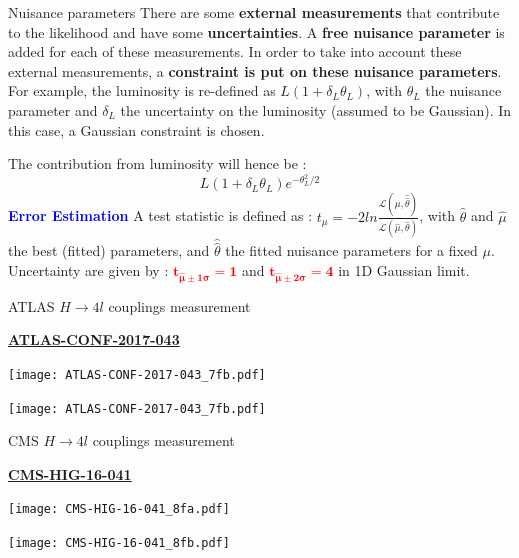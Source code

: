 \begin{frame}{Nuisance parameters}
There are some {\bf external measurements}  that contribute to the likelihood and have some {\bf uncertainties}. 
A {\bf free nuisance parameter} is added for each of these measurements.
In order  to take into account these external measurements, a {\bf constraint is put on these nuisance parameters}. 
\vfill
For example, the luminosity is re-defined as  $L(1+\delta_L \theta_L)$, with $\theta_L$ the nuisance parameter and $\delta_L$ the uncertainty on the luminosity (assumed to be Gaussian).
In this case, a Gaussian constraint is chosen.

The contribution from luminosity will hence be :
$$L(1+\delta_L \theta_L)e^{-\theta_L^2/2}$$
\vfill
\textcolor{blue}{\bf Error Estimation}\newline
A test statistic is defined as : $t_\mu=-2ln\frac{\mathcal{L}(\mu,\hat{\hat{\theta}})}{\mathcal{L}(\hat{\mu},\hat{\theta})}$, with $\hat{\theta}$ and $\hat{\mu}$ the best (fitted) parameters, and $\hat{\hat{\theta}}$ the fitted nuisance parameters for a fixed $\mu$.\newline
Uncertainty are given by : \textcolor{red}{$\mathbf{t_{\hat{\mu}\pm 1\sigma}=1}$} and \textcolor{red}{$\mathbf{t_{\hat{\mu}\pm 2\sigma}=4}$} in 1D Gaussian limit.
\end{frame}
\begin{frame}{ATLAS $H\rightarrow 4l$ couplings measurement}

  \begin{center} \href{https://cds.cern.ch/record/2273849}{\bf ATLAS-CONF-2017-043} \end{center}
  
  \begin{minipage}{0.49\linewidth}
    \texttt{[image: ATLAS-CONF-2017-043\_7fb.pdf]}
  \end{minipage}
  \hfill
  \begin{minipage}{0.49\linewidth}
    \texttt{[image: ATLAS-CONF-2017-043\_7fb.pdf]}
    \end{minipage}
\end{frame}

\begin{frame}{CMS $H\rightarrow 4l$ couplings measurement}

  \begin{center} \href{http://cds.cern.ch/record/2272260}{\bf CMS-HIG-16-041} \end{center}
  
  \begin{minipage}{0.49\linewidth}
    \texttt{[image: CMS-HIG-16-041\_8fa.pdf]}
  \end{minipage}
  \hfill
  \begin{minipage}{0.49\linewidth}
    \texttt{[image: CMS-HIG-16-041\_8fb.pdf]}
    \end{minipage}
\end{frame}

